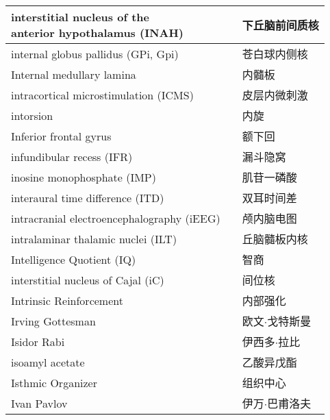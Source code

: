 \begin{longtable}{lll}
	\midrule
	\makecell[l]{interstitial nucleus of the \\anterior hypothalamus  (INAH)} && 下丘脑前间质核  \\
	
	\midrule
	internal globus pallidus (GPi, Gpi)  && 苍白球内侧核  \\
	
	\midrule
	Internal medullary lamina  && 内髓板  \\
	
	\midrule
	intracortical microstimulation (ICMS)  && 皮层内微刺激  \\
	
	\midrule
	intorsion   && 内旋  \\
	
	\midrule
	Inferior frontal gyrus   && 额下回  \\
	
	\midrule
	infundibular recess (IFR)   && 漏斗隐窝  \\
	
	\midrule
	inosine monophosphate (IMP)  && 肌苷一磷酸  \\
	
	\midrule
	interaural time difference (ITD)   && 双耳时间差  \\
	
	\midrule
	intracranial electroencephalography (iEEG)  && 颅内脑电图  \\
	
	\midrule
	intralaminar thalamic nuclei (ILT)  && 丘脑髓板内核  \\
	
	\midrule
	Intelligence Quotient (IQ)   && 智商  \\
	
	\midrule
	interstitial nucleus of Cajal (iC)   && 间位核  \\
	
	\midrule
	Intrinsic Reinforcement   && 内部强化  \\
	
	\midrule
	Irving Gottesman   && 欧文$\cdot$戈特斯曼  \\
	
	\midrule
	Isidor Rabi   && 伊西多$\cdot$拉比  \\
	
	\midrule
	isoamyl acetate   && 乙酸异戊酯  \\
	
	\midrule
	Isthmic Organizer   && 组织中心  \\
	
	\midrule
	Ivan Pavlov   && 伊万$\cdot$巴甫洛夫  \\
	

\end{longtable}
